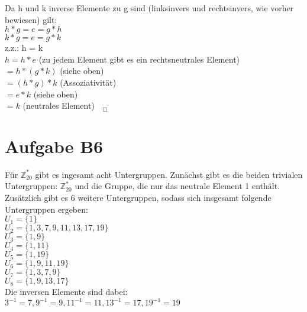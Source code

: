 \documentclass[11pt,a4paper]{article}
\begin{document}
Da h und k inverse Elemente zu g sind (linksinvers und rechtsinvers, wie vorher bewiesen) gilt: \\
$ h \ast  g = e = g \ast  h$ \\
$ k \ast  g = e = g \ast  k$  \\

z.z.: h = k \\
$h = h \ast e$   (zu jedem Element gibt es ein rechtsneutrales Element) \\
$= h \ast (g \ast k)$    (siehe oben) \\
$= (h \ast g) \ast k$    (Assoziativität) \\
$= e \ast k$      (siehe oben) \\
$=k$       (neutrales Element) $~~~_\Box$ \\

\section*{Aufgabe B6}
Für $\mathbb{Z}^{*}_{20}$ gibt es ingesamt acht Untergruppen. Zunächst gibt es die beiden trivialen Untergruppen:  $\mathbb{Z}^{*}_{20}$ und die Gruppe, die nur das neutrale Element 1 enthält. Zusätzlich gibt es 6 weitere Untergruppen, sodass sich insgesamt folgende Untergruppen ergeben: \\

$U_1 =\{1\}$ \\
$U_2 = \{1,3,7,9,11,13,17,19\}$\\
$U_3=\{1,9\}$\\
$U_4=\{1,11\}$\\
$U_5=\{1,19\}$\\
$U_6=\{1,9,11,19\}$\\
$U_7=\{1,3,7,9\}$\\
$U_8=\{1,9,13,17\}$\\

Die inversen Elemente sind dabei: \\
$3^{-1}=7, 9^{-1}=9, 11^{-1}=11, 13^{-1}=17, 19^{-1}=19$\\
\end{document}
